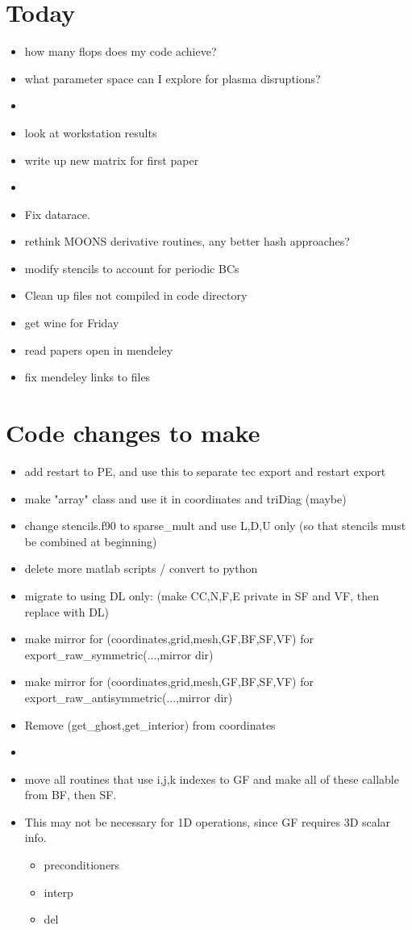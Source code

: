 \documentclass[11pt]{article}
\begin{document}
\section{Today}
\begin{itemize}
\setlength\itemsep{-1em}
\item how many flops does my code achieve?
\item what parameter space can I explore for plasma disruptions?
% 
\item
\item look at workstation results
\item write up new matrix for first paper
\item
% 
\item Fix datarace.
\item rethink MOONS derivative routines, any better hash approaches?
\item modify stencils to account for periodic BCs
\item Clean up files not compiled in code directory
\item get wine for Friday
\item read papers open in mendeley
\item fix mendeley links to files
\end{itemize}

\section{Code changes to make}
\begin{itemize}
\setlength\itemsep{-1em}
\item add restart to PE, and use this to separate tec export and restart export
\item make "array" class and use it in coordinates and triDiag (maybe)
\item change stencils.f90 to sparse\_mult and use L,D,U only (so that stencils must be combined at beginning)
\item delete more matlab scripts / convert to python
\item migrate to using DL only: (make CC,N,F,E private in SF and VF, then replace with DL)
\item make mirror for (coordinates,grid,mesh,GF,BF,SF,VF) for export\_raw\_symmetric(...,mirror dir)
\item make mirror for (coordinates,grid,mesh,GF,BF,SF,VF) for export\_raw\_antisymmetric(...,mirror dir)
\item Remove (get\_ghost,get\_interior) from coordinates
\item 
\item move all routines that use i,j,k indexes to GF and make all of these callable from BF, then SF.
\item This may not be necessary for 1D operations, since GF requires 3D scalar info.
\begin{itemize}
\setlength\itemsep{-1em}
\item preconditioners
\item interp
\item del
\end{itemize}
\end{itemize}
\end{document}
